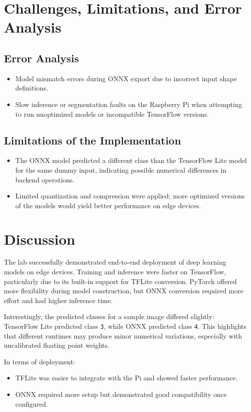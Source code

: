 \documentclass[a4paper,12pt]{article}
\begin{document}
\section{Challenges, Limitations, and Error Analysis}

\subsection{Error Analysis}
\begin{itemize}
    \item Model mismatch errors during ONNX export due to incorrect input shape definitions.
    \item Slow inference or segmentation faults on the Raspberry Pi when attempting to run unoptimized models or incompatible TensorFlow versions.
\end{itemize}

\subsection{Limitations of the Implementation}
\begin{itemize}
    \item The ONNX model predicted a different class than the TensorFlow Lite model for the same dummy input, indicating possible numerical differences in backend operations.
    \item Limited quantization and compression were applied; more optimized versions of the models would yield better performance on edge devices.
\end{itemize}

\section{Discussion}
The lab successfully demonstrated end-to-end deployment of deep learning models on edge devices. Training and inference were faster on TensorFlow, particularly due to its built-in support for TFLite conversion. PyTorch offered more flexibility during model construction, but ONNX conversion required more effort and had higher inference time.

Interestingly, the predicted classes for a sample image differed slightly: TensorFlow Lite predicted class \texttt{3}, while ONNX predicted class \texttt{4}. This highlights that different runtimes may produce minor numerical variations, especially with uncalibrated floating point weights.

In terms of deployment:
\begin{itemize}
    \item TFLite was easier to integrate with the Pi and showed faster performance.
    \item ONNX required more setup but demonstrated good compatibility once configured.
\end{itemize}
\end{document}
